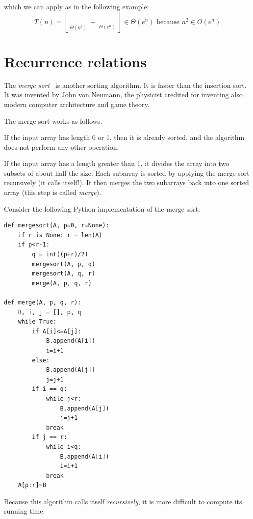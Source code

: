 \documentclass[justified, sixbynine]{tufte-book}
\def\stackunder#1#2{\mathrel{\mathop{#2}\limits_{#1}}}
\theoremstyle{plain}%
\newtheorem * {corollary}{Corollary}
\theoremstyle{definition}
\theoremstyle{remark}
\newtheorem * {remark}{Remark}
\newtheorem * {note}{Note}
\begin{document}
\begin{fullwidth}
which we can apply as in the following example:
\begin{equation}
T(n)=[\stackunder{\Theta (n^2)}{\underbrace{n^2+n+3}}+\stackunder{\Theta
(e^n)}{\underbrace{e^n-\log n}}]\in \Theta (e^n)\text{ because }n^2\in
O(e^n)
\end{equation}

\goodbreak\section{Recurrence relations}



The {\it merge sort}~\cite{mergesort} is another sorting algorithm. It is faster than the insertion sort. It was invented by John von Neumann, the physicist credited for inventing also modern computer architecture and game theory.

The merge sort works as follows.

If the input array has length 0 or 1, then it is already sorted, and the algorithm does not perform any other operation.

If the input array has a length greater than 1, it divides the array into two subsets of about half the size. Each subarray is sorted by applying the merge sort recursively (it calls itself!). It then merges the two subarrays back into one sorted array (this step is called {\it merge}).

Consider the following Python implementation of the merge sort:

\begin{lstlisting}
def mergesort(A, p=0, r=None):
    if r is None: r = len(A)
    if p<r-1:
        q = int((p+r)/2)
        mergesort(A, p, q)
        mergesort(A, q, r)
        merge(A, p, q, r)

def merge(A, p, q, r):
    B, i, j = [], p, q
    while True:
        if A[i]<=A[j]:
            B.append(A[i])
            i=i+1
        else:
            B.append(A[j])
            j=j+1
        if i == q:
            while j<r:
                B.append(A[j])
                j=j+1
            break
        if j == r:
            while i<q:
                B.append(A[i])
                i=i+1
            break
    A[p:r]=B
\end{lstlisting}


Because this algorithm calls itself {\it recursively}, it is more difficult to compute its running time.


\end{fullwidth}
\end{document}
